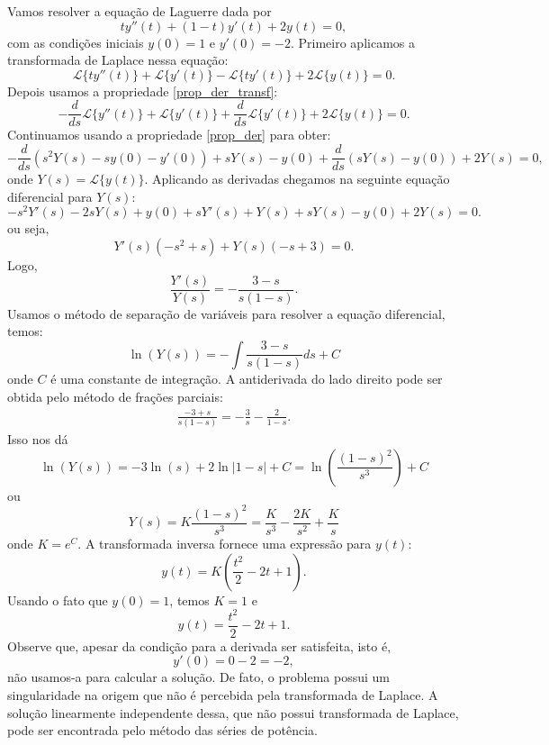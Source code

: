\documentclass[Main.tex]{subfiles}
\begin{document}
\begin{ex}Vamos resolver a equação de Laguerre dada por
$$
ty''(t)+(1-t)y'(t)+2y(t)=0,
$$
com as condições iniciais $y(0)=1$ e $y'(0)=-2$. Primeiro aplicamos a transformada de Laplace nessa equação:
$$
\mathcal{L}\{ty''(t)\}+\mathcal{L}\{y'(t)\}-\mathcal{L}\{ty'(t)\}+2\mathcal{L}\{y(t)\}=0.
$$
Depois usamos a propriedade \ref{prop_der_transf}:
$$
-\frac{d}{ds}\mathcal{L}\{y''(t)\}+\mathcal{L}\{y'(t)\}+\frac{d}{ds}\mathcal{L}\{y'(t)\}+2\mathcal{L}\{y(t)\}=0.
$$
Continuamos usando a propriedade \ref{prop_der} para obter:
$$
-\frac{d}{ds}\left(s^2Y(s)-sy(0)-y'(0)\right)+sY(s)-y(0)+\frac{d}{ds}\left(sY(s)-y(0)\right)+2Y(s)=0,
$$
onde $Y(s)=\mathcal{L}\{y(t)\}$. Aplicando as derivadas chegamos na seguinte equação diferencial para $Y(s)$:
$$
-s^2Y'(s)-2sY(s)+y(0)+sY'(s)+Y(s)+sY(s)-y(0)+2Y(s)=0.
$$
ou seja,
$$
Y'(s)\left(-s^2+s\right)+Y(s)\left(-s+3\right)=0.
$$
Logo,
$$
\frac{Y'(s)}{Y(s)}=-\frac{3-s}{s(1-s)}.
$$
Usamos o método de separação de variáveis para resolver a equação diferencial, temos:
$$
\ln(Y(s))=-\int \frac{3-s}{s(1-s)} ds +C
$$
onde $C$ é uma constante de integração. A antiderivada do lado direito pode ser obtida pelo método de frações parciais:
\begin{eqnarray*}
\frac{-3+s}{s(1-s)}=-\frac{3}{s}-\frac{2}{1-s}.
\end{eqnarray*}
Isso nos dá
$$
\ln(Y(s))=-3\ln(s)+2\ln|1-s|+C=\ln\left(\frac{(1-s)^2}{s^3} \right)+C
$$
ou
$$
Y(s)=K\frac{(1-s)^2}{s^3}=\frac{K}{s^3}-\frac{2K}{s^2}+\frac{K}{s}
$$
onde $K=e^C$. A transformada inversa fornece uma expressão para $y(t)$:
$$
y(t)=K\left(\frac{t^2}{2}-2t+1\right).
$$
Usando o fato que $y(0)=1$, temos $K=1$ e
$$
y(t)=\frac{t^2}{2}-2t+1.
$$
Observe que, apesar da condição para a derivada ser satisfeita, isto é,
$$
y'(0)=0-2=-2,
$$
não usamos-a para calcular a solução. De fato, o problema possui um singularidade na origem que não é percebida pela transformada de Laplace. A solução linearmente independente dessa, que não possui transformada de Laplace, pode ser encontrada pelo método das séries de potência.
\end{ex}
\end{document}
